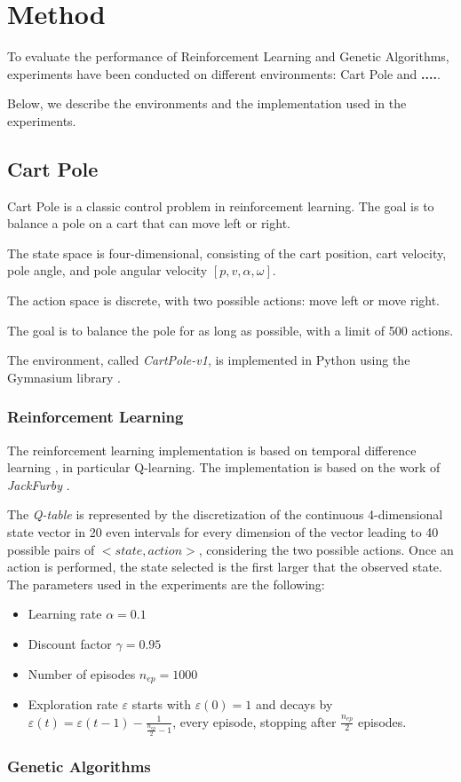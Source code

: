 \section{Method}
To evaluate the performance of Reinforcement Learning and Genetic Algorithms,
experiments have been conducted on different environments:
Cart Pole and \textbf{....}.

Below, we describe the environments and the implementation used in the experiments.
\subsection{Cart Pole}
Cart Pole is a classic control problem in reinforcement learning. 
The goal is to balance a pole on a cart that can move left or right. 

The state space is four-dimensional, consisting of the cart position, cart velocity, pole angle, and pole angular velocity $[p, v, \alpha, \omega]$. 

The action space is discrete, with two possible actions: move left or move right. 

The goal is to balance the pole for as long as possible, with a limit of 500 actions.

The environment, called \textit{CartPole-v1}, is implemented in Python using the Gymnasium library \cite{towers_gymnasium_2023}.

\subsubsection{Reinforcement Learning}
The reinforcement learning implementation is based on temporal difference learning \cite{sutton1998temporal}, 
in particular Q-learning.
The implementation is based on the work of \textit{JackFurby} \cite{JackFurbyCartPole}.

The \textit{Q-table} is represented by the discretization of the continuous 4-dimensional state vector in 20 even intervals for every dimension of the vector leading to 40 possible pairs of $<state,action>$, considering the two possible actions.
Once an action is performed, the state selected is the first larger that the observed state.\\
The parameters used in the experiments are the following:
\begin{itemize}
    \item Learning rate $\alpha = 0.1$
    \item Discount factor $\gamma = 0.95$
    \item Number of episodes $n_{ep} = 1000$
    \item Exploration rate $\varepsilon$ starts with $\varepsilon(0)=1$ and decays by $\varepsilon(t) = \varepsilon(t - 1) - \frac{1}{\frac{n_{ep}}{2} - 1}$, every episode, stopping after $\frac{n_{ep}}{2}$ episodes.
\end{itemize}
\subsubsection{Genetic Algorithms}

